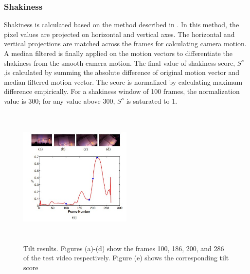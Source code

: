 \documentclass{sig-alternate}
\begin{document}
\subsubsection{Shakiness}
Shakiness is calculated based on the method described in \cite{wyszecki1982color}. In this method, the pixel values are projected on horizontal and vertical axes. The horizontal and vertical projections are matched across the frames for calculating camera motion. A median filtered is finally applied on the motion vectors to differentiate the shakiness from the smooth camera motion. The ﬁnal value of shakiness score, \(S^s\),is calculated by summing the absolute difference of original motion vector and median ﬁltered motion vector. The score is normalized by calculating maximum difference empirically. For a shakiness window of 100 frames, the normalization value is 300; for any value above 300, \(S^s\) is saturated to 1.

 \begin{figure}[h]
\includegraphics[width=0.5\textwidth ,height = 7cm]{image4}
\caption{Tilt results. Figures (a)-(d) show the frames 100, 186, 200, and 286 of the test video respectively. Figure (e) shows the corresponding tilt score}
\label{fig:figure4}
\end{figure}
\end{document}
